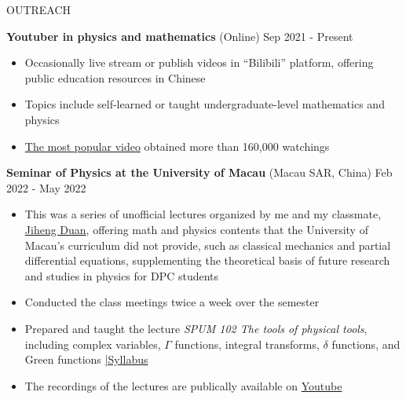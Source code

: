 \documentclass[11pt]{article}
\begin{document}
\begin{section}{OUTREACH}

\textbf{Youtuber in physics and mathematics} (Online) \hfill {Sep 2021 - Present}
\begin{itemize}[leftmargin=1.5em]
    \item Occasionally live stream or publish videos in ``Bilibili'' platform, offering public education resources in Chinese
    \item Topics include self-learned or taught undergraduate-level mathematics and physics
    \item \href{https://www.bilibili.com/video/BV1th411W7xu/}{The most popular video} obtained more than 160,000 watchings
\end{itemize}

\textbf{Seminar of Physics at the University of Macau} (Macau SAR, China) \hfill {Feb 2022 - May 2022}
\begin{itemize}[leftmargin=1.5em]
    \item This was a series of unofficial lectures organized by me and my classmate, \href{http://runawayfancy.me/}{Jiheng Duan}, offering math and physics contents that the University of Macau's curriculum did not provide, such as classical mechanics and partial differential equations, supplementing the theoretical basis of future research and studies in physics for DPC students 
    \item Conducted the class meetings twice a week over the semester
    \item Prepared and taught the lecture \textit{SPUM 102 The tools of physical tools}, including complex variables, $\Gamma$ functions, integral transforms, $\delta$ functions, and Green functions \hfill {\footnotesize \href{https://github.com/Chisen-Lupus/Seminar-of-Physics-UM/blob/main/SPUM%20102%20The%20tools%20of%20physical%20tool.pdf}{|Syllabus}}
    \item The recordings of the lectures are publically available on \href{https://www.youtube.com/watch?v=nQkv03r-XeQ&list=PLV9fHDZW7hHWQ9rrAk7c9kdeV-Lqyt7pV&index=10}{Youtube}
\end{itemize}

\end{section}

\newpage
    
\end{document}
